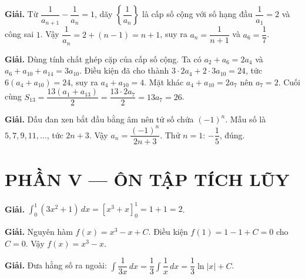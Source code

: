 \documentclass[11pt, a4paper]{article}
\begin{document}
\vspace{0.3cm}
\begin{dapan}[25 — Đáp án A]

\textbf{Giải.} Từ $\dfrac{1}{a_{n+1}}-\dfrac{1}{a_n}=1$, dãy $\left\{\dfrac{1}{a_n}\right\}$ là cấp số cộng với số hạng đầu $\dfrac{1}{a_1}=2$ và công sai $1$. Vậy $\dfrac{1}{a_n}=2+(n-1)=n+1$, suy ra $a_n=\dfrac{1}{n+1}$ và $a_6=\dfrac{1}{7}$.


\end{dapan}
\vspace{0.3cm}
\begin{dapan}[26 — Đáp án D]

\textbf{Giải.} Dùng tính chất ghép cặp của cấp số cộng. Ta có $a_2+a_6=2a_4$ và $a_6+a_{10}+a_{14}=3a_{10}$. Điều kiện đã cho thành $3\cdot2a_4+2\cdot3a_{10}=24$, tức $6(a_4+a_{10})=24$, suy ra $a_4+a_{10}=4$. Mặt khác $a_4+a_{10}=2a_7$ nên $a_7=2$. Cuối cùng $S_{13}=\dfrac{13(a_1+a_{13})}{2}=\dfrac{13\cdot2a_7}{2}=13a_7=26$.


\end{dapan}
\vspace{0.3cm}
\begin{dapan}[27 — Đáp án B]

\textbf{Giải.} Dấu đan xen bắt đầu bằng âm nên tử số chứa $(-1)^n$. Mẫu số là $5,7,9,11,\ldots$, tức $2n+3$. Vậy $a_n=\dfrac{(-1)^n}{2n+3}$. Thử $n=1$: $-\dfrac{1}{5}$, đúng.

\section{PHẦN V — ÔN TẬP TÍCH LŨY}


\end{dapan}
\vspace{0.3cm}
\begin{dapan}[28 — Đáp án D]

\textbf{Giải.} $\displaystyle\int_0^1 (3x^2+1)\,dx=\left[x^3+x\right]_0^1=1+1=2$.


\end{dapan}
\vspace{0.3cm}
\begin{dapan}[29 — Đáp án A]

\textbf{Giải.} Nguyên hàm $f(x)=x^3-x+C$. Điều kiện $f(1)=1-1+C=0$ cho $C=0$. Vậy $f(x)=x^3-x$.


\end{dapan}
\vspace{0.3cm}
\begin{dapan}[30 — Đáp án A]

\textbf{Giải.} Đưa hằng số ra ngoài: $\displaystyle\int\dfrac{1}{3x}\,dx=\dfrac{1}{3}\int\dfrac{1}{x}\,dx=\dfrac{1}{3}\ln\lvert x\rvert+C$.


\end{dapan}
\end{document}
